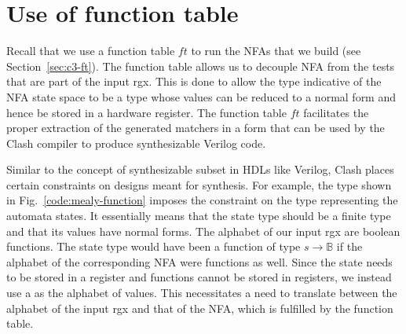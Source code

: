 \section{Use of function table} \label{sec:ft-clash}
Recall that we use a function table $ft$ to run the \glspl{NFA} that
we build (see Section~\ref{sec:c3-ft}).
The function table allows us to decouple \gls{NFA} from the
tests that are part of the input \gls{rgx}.
%
This is done to allow the type indicative of the \gls{NFA} state space
to be a type whose values can be reduced to a normal form and hence be
stored in a hardware register.
%
%
The function table $ft$ facilitates the proper extraction of the
generated matchers in a form that can be used by the Clash compiler to
produce synthesizable Verilog code.
%

Similar to the concept of synthesizable subset in \glspl{HDL}
like Verilog, Clash places certain constraints on designs meant for
synthesis.
For example, the  type shown in
Fig.~\ref{code:mealy-function} imposes the constraint 
on the type representing the automata states.
%
%
It essentially means that the state type should be a finite type and
that its values have normal forms.
%
The alphabet of our input \gls{rgx} are boolean functions.
The state type would have been a function of type $s \to \mathbb{B}$
if the alphabet of the corresponding \gls{NFA} were functions as well.
%
Since the state needs to be stored in a register and functions cannot
be stored in registers, we instead use a  as the alphabet
of  values.
This necessitates a need to translate between the alphabet of the
input \gls{rgx} and that of the \gls{NFA}, which is fulfilled by the
function table.



